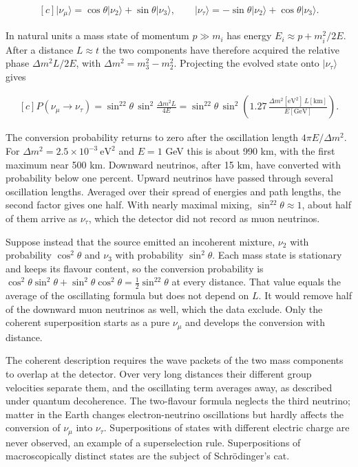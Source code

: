 \documentclass[11pt,oneside]{book}
\newenvironment{centeredalign}{\[\begin{gathered}[c]}{\end{gathered}\]}
\newcommand{\ket}[1]{\lvert #1\rangle}
\begin{document}
\begin{centeredalign}
\ket{\nu_\mu}=\cos\theta\ket{\nu_2}+\sin\theta\ket{\nu_3},\qquad
\ket{\nu_\tau}=-\sin\theta\ket{\nu_2}+\cos\theta\ket{\nu_3}.
\end{centeredalign}

In natural units a mass state of momentum \(p\gg m_i\) has energy \(E_i\approx p+m_i^2/2E\). After a distance \(L\approx t\) the two components have therefore acquired the relative phase \(\Delta m^2L/2E\), with \(\Delta m^2=m_3^2-m_2^2\). Projecting the evolved state onto \(\ket{\nu_\tau}\) gives

\begin{centeredalign}
P(\nu_\mu\to\nu_\tau)=\sin^22\theta\,\sin^2\frac{\Delta m^2L}{4E}
=\sin^22\theta\,\sin^2\!\left(1.27\,\frac{\Delta m^2[\mathrm{eV}^2]\,L[\mathrm{km}]}{E[\mathrm{GeV}]}\right).
\end{centeredalign}

The conversion probability returns to zero after the oscillation length \(4\pi E/\Delta m^2\). For \(\Delta m^2=2.5\times10^{-3}\ \mathrm{eV}^2\) and \(E=1\) GeV this is about 990 km, with the first maximum near 500 km. Downward neutrinos, after 15 km, have converted with probability below one percent. Upward neutrinos have passed through several oscillation lengths. Averaged over their spread of energies and path lengths, the second factor gives one half. With nearly maximal mixing, \(\sin^22\theta\approx1\), about half of them arrive as \(\nu_\tau\), which the detector did not record as muon neutrinos.

Suppose instead that the source emitted an incoherent mixture, \(\nu_2\) with probability \(\cos^2\theta\) and \(\nu_3\) with probability \(\sin^2\theta\). Each mass state is stationary and keeps its flavour content, so the conversion probability is \(\cos^2\theta\sin^2\theta+\sin^2\theta\cos^2\theta=\tfrac12\sin^22\theta\) at every distance. That value equals the average of the oscillating formula but does not depend on \(L\). It would remove half of the downward muon neutrinos as well, which the data exclude. Only the coherent superposition starts as a pure \(\nu_\mu\) and develops the conversion with distance.

The coherent description requires the wave packets of the two mass components to overlap at the detector. Over very long distances their different group velocities separate them, and the oscillating term averages away, as described under quantum decoherence. The two-flavour formula neglects the third neutrino; matter in the Earth changes electron-neutrino oscillations but hardly affects the conversion of \(\nu_\mu\) into \(\nu_\tau\). Superpositions of states with different electric charge are never observed, an example of a superselection rule. Superpositions of macroscopically distinct states are the subject of Schrödinger's cat.
\end{document}
